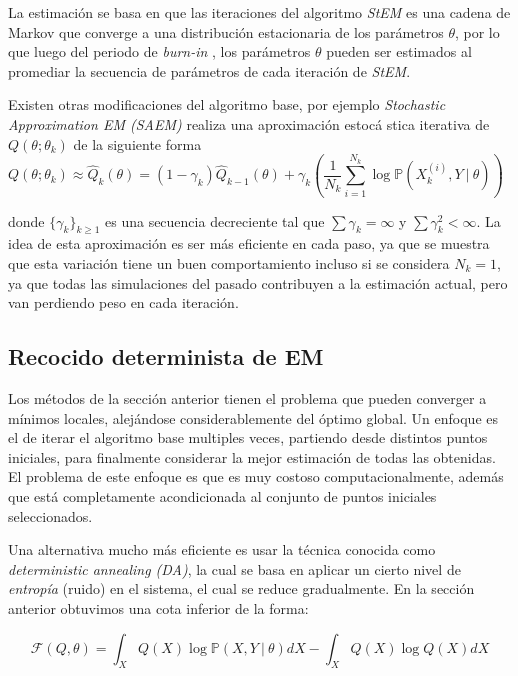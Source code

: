 La estimación se basa en que las iteraciones del algoritmo \emph{StEM}
es una cadena de Markov que converge a una distribución estacionaria de
los parámetros $\theta $, por lo que luego del periodo de \emph{burn-in}%
, los parámetros $\theta $ pueden ser estimados al promediar la
secuencia de parámetros de cada iteración de \emph{StEM}.

Existen otras modificaciones del algoritmo base, por ejemplo \emph{%
	Stochastic Approximation EM (SAEM)} realiza una aproximación estocá%
stica iterativa de $Q(\theta ;\theta _{k})$ de la siguiente forma%
\begin{equation*}
Q(\theta ;\theta _{k})\approx \hat{Q}_{k}(\theta )=(1-\gamma _{k})\hat{Q}%
_{k-1}(\theta )+\gamma _{k}(\frac{1}{N_{k}}\sum_{i=1}^{N_{k}}\log \mathbb{P}%
(X_{k}^{(i)},Y\ |\ \theta ))\text{ }
\end{equation*}

donde $\{\gamma _{k}\}_{k\geq 1}$ es una secuencia decreciente tal que $\sum\gamma _{k}=\infty $ y $\sum \gamma _{k}^{2}<\infty$. La idea de esta aproximación es ser más eficiente en cada paso, ya que se muestra que esta variación tiene un buen comportamiento incluso si se considera $N_{k}=1$, ya que todas las simulaciones del pasado contribuyen a la estimación actual, pero van perdiendo peso en cada iteración.


\subsection{Recocido determinista de EM}

Los métodos de la sección anterior tienen el problema que pueden converger a mínimos locales, alejándose considerablemente del óptimo global. Un enfoque es el de iterar el algoritmo base multiples veces, partiendo desde distintos puntos iniciales, para finalmente considerar la mejor estimación de todas las obtenidas. El problema de este enfoque es que es muy costoso computacionalmente, además que está completamente acondicionada al conjunto de puntos iniciales seleccionados.

Una alternativa mucho más eficiente es usar la técnica conocida como \emph{deterministic annealing (DA)}, la cual se basa en aplicar un cierto nivel de \emph{entropía} (ruido) en el sistema, el cual se reduce gradualmente. En la sección anterior obtuvimos una cota inferior de la forma:

\begin{equation*}
\mathcal{F}(Q,\theta )=\int_{X}Q(X)\log \mathbb{P}(X,Y\ |\ \theta
)dX-\int_{X}Q(X)\log Q(X)dX
\end{equation*}

